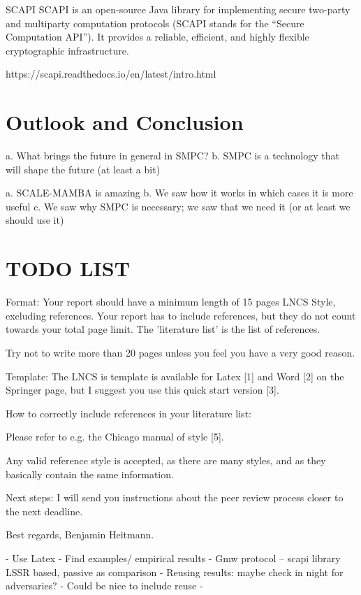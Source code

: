 \documentclass[english,runningheads,a4paper]{llncs}[2018/03/10]
\begin{document}
SCAPI
SCAPI is an open-source Java library for implementing secure two-party and multiparty computation protocols (SCAPI stands for the “Secure Computation API”). It provides a reliable, efficient, and highly flexible cryptographic infrastructure.

https://scapi.readthedocs.io/en/latest/intro.html


\section{Outlook and Conclusion}\label{sec:outlook}

a.	What brings the future in general in SMPC?
b.	SMPC is a technology that will shape the future (at least a bit)


a.	SCALE-MAMBA is amazing
b.	We saw how it works in which cases it is more useful
c.	We saw why SMPC is necessary; we saw that we need it (or at least we should use it)



\section{TODO LIST}\label{sec:xxx}


Format: 
Your report should have a minimum length of 15 pages LNCS Style, excluding references. 
Your report has to include references, but they do not count towards your total page limit. The 'literature list' is the list of references. 

Try not to write more than 20 pages unless you feel you have a very good reason. 

Template: 
The LNCS is template is available for Latex [1] and Word [2] on the Springer page, 
but I suggest you use this quick start version [3]. 

How to correctly include references in your literature list: 

Please refer to e.g. the Chicago manual of style [5].

Any valid reference style is accepted, as there are many styles, and as they basically contain the same information. 



Next steps: 
I will send you instructions about the peer review process closer to the next deadline.



Best regards, Benjamin Heitmann.



-	Use Latex
-	Find examples/ empirical results
-	Gmw protocol – scapi library LSSR based, passive as comparison
-	Reusing results: maybe check in night for adversaries?
-	Could be nice to include reuse
-	
\end{document}
